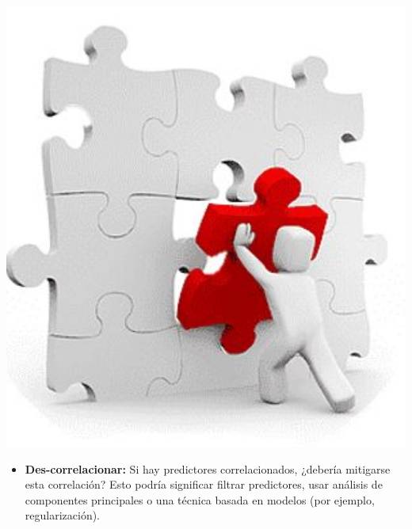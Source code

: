 \documentclass[
]{book}
\providecommand{\tightlist}{%
  \setlength{\itemsep}{0pt}\setlength{\parskip}{0pt}}
\begin{document}
\begin{center}\includegraphics[width=400pt]{img/04-ml/imputar} \end{center}

\begin{itemize}
\tightlist
\item
  \textbf{Des-correlacionar:} Si hay predictores correlacionados, ¿debería mitigarse esta correlación? Esto podría significar filtrar predictores, usar análisis de componentes principales o una técnica basada en modelos (por ejemplo, regularización).
\end{itemize}
\end{document}
